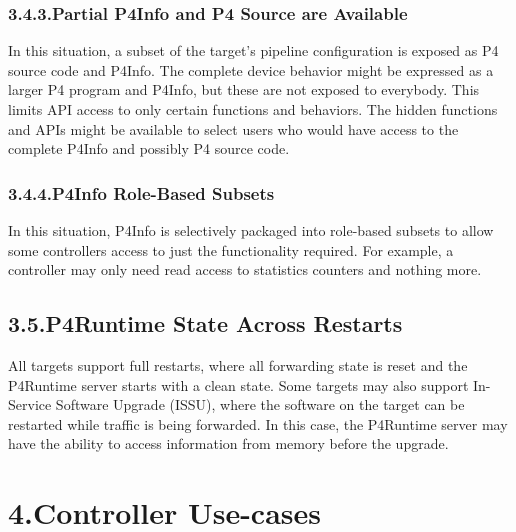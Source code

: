 \documentclass[11pt]{article}
\begin{document}
{%
\subsubsection{3.4.3.\hspace*{0.5em}Partial P4Info and P4 Source are Available}\label{sec-partial-p4info-and-p4-source-are-available}%

\noindent{}In this situation, a subset of the target's pipeline configuration is exposed as
P4 source code and P4Info. The complete device behavior might be expressed as a
larger P4 program and P4Info, but these are not exposed to everybody. This
limits API access to only certain functions and behaviors. The hidden functions
and APIs might be available to select users who would have access to the
complete P4Info and possibly P4 source code.%

\subsubsection{3.4.4.\hspace*{0.5em}P4Info Role-Based Subsets}\label{sec-p4info-role-based-subsets}%

\noindent{}In this situation, P4Info is selectively packaged into role-based subsets to
allow some controllers access to just the functionality required. For example, a
controller may only need read access to statistics counters and nothing more.%

\subsection{3.5.\hspace*{0.5em}P4Runtime State Across Restarts}\label{sec-restarts}%

\noindent{}All targets support full restarts, where all forwarding state is reset and the
P4Runtime server starts with a clean state.  Some targets may also support
In-Service Software Upgrade (ISSU), where the software on the target can be
restarted while traffic is being forwarded. In this case, the P4Runtime server
may have the ability to access information from memory before the upgrade.%

\section{4.\hspace*{0.5em}Controller Use-cases}\label{sec-controller-use-cases}%

}
\end{document}

